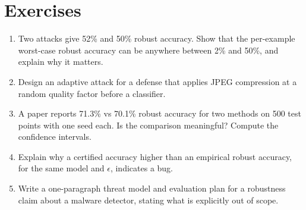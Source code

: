 \documentclass[10pt,a4paper]{extarticle}
\theoremstyle{definition}
\begin{document}
\section*{Exercises}

\begin{enumerate}[label=\textbf{\arabic*.}]
  \item Two attacks give 52\% and 50\% robust accuracy. Show that the per-example worst-case robust accuracy can be anywhere between 2\% and 50\%, and explain why it matters.
  \item Design an adaptive attack for a defense that applies JPEG compression at a random quality factor before a classifier.
  \item A paper reports 71.3\% vs 70.1\% robust accuracy for two methods on 500 test points with one seed each. Is the comparison meaningful? Compute the confidence intervals.
  \item Explain why a certified accuracy higher than an empirical robust accuracy, for the same model and \(\epsilon\), indicates a bug.
  \item Write a one-paragraph threat model and evaluation plan for a robustness claim about a malware detector, stating what is explicitly out of scope.
\end{enumerate}



\end{document}
